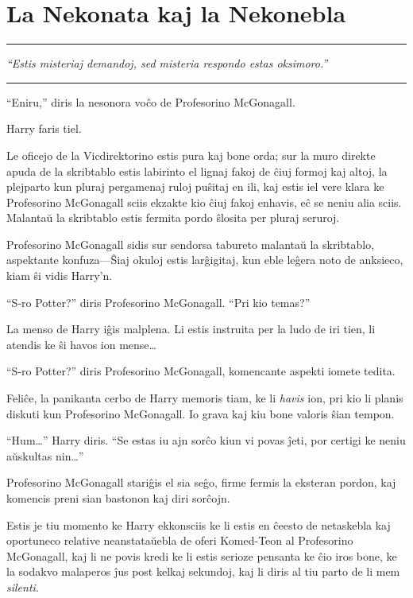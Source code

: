 \chapter{La Nekonata kaj la Nekonebla}

\begin{center}\rule{3in}{0.4pt}\end{center}

\emph{``Estis misteriaj demandoj, sed misteria respondo estas oksimoro.''}  

\begin{center}\rule{3in}{0.4pt}\end{center}

``Eniru,'' diris la nesonora voĉo de Profesorino McGonagall.

Harry faris tiel.

Le oficejo de la Vicdirektorino estis pura kaj bone orda; sur la muro
direkte apuda de la skribtablo estis labirinto el lignaj fakoj de ĉiuj
formoj kaj altoj, la plejparto kun pluraj pergamenaj ruloj puŝitaj en
ili, kaj estis iel vere klara ke Profesorino McGonagall sciis ekzakte
kio ĉiuj fakoj enhavis, eĉ se neniu alia sciis. Malantaŭ la skribtablo
estis fermita pordo ŝlosita per pluraj seruroj.

Profesorino McGonagall sidis sur sendorsa tabureto malantaŭ la
skribtablo, aspektante konfuza—Ŝiaj okuloj estis larĝigitaj, kun eble
leĝera noto de anksieco, kiam ŝi vidis Harry'n.

``S-ro Potter?'' diris Profesorino McGonagall. ``Pri kio temas?''

La menso de Harry iĝis malplena. Li estis instruita per la ludo de iri
tien, li atendis ke ŝi havos ion mense\ldots

``S-ro Potter?'' diris Profesorino McGonagall, komencante aspekti
iomete tedita.

Feliĉe, la panikanta cerbo de Harry memoris tiam, ke li \emph{havis}
ion, pri kio li planis diskuti kun Profesorino McGonagall. Io grava
kaj kiu bone valoris ŝian tempon.

``Hum\ldots'' Harry diris. ``Se estas iu ajn sorĉo kiun vi povas ĵeti,
por certigi ke neniu aŭskultas nin\ldots''

Profesorino McGonagall stariĝis el sia seĝo, firme fermis la eksteran
pordon, kaj komencis preni sian bastonon kaj diri sorĉojn.

Estis je tiu momento ke Harry ekkonsciis ke li estis en ĉeesto de
netaskebla kaj oportuneco relative neanstataŭebla de oferi Komed-Teon
al Profesorino McGonagall, kaj li ne povis kredi ke li estis serioze
pensanta ke ĉio iros bone, ke la sodakvo malaperos ĵus post kelkaj
sekundoj, kaj li diris al tiu parto de li mem \emph{silenti}.

